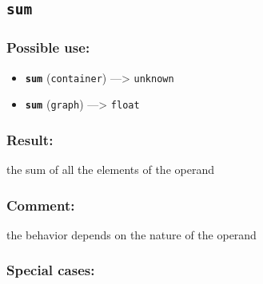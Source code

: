 \documentclass[]{book}
\providecommand{\tightlist}{%
  \setlength{\itemsep}{0pt}\setlength{\parskip}{0pt}}
\theoremstyle{definition}
\theoremstyle{definition}
\theoremstyle{definition}
\theoremstyle{remark}
\begin{document}
\subsection{\texorpdfstring{\texttt{sum}}{sum}}\label{sum}

\subsubsection{Possible use:}\label{possible-use-509}

\begin{itemize}
\tightlist
\item
  \textbf{\texttt{sum}} (\texttt{container}) ---\textgreater{}
  \texttt{unknown}
\item
  \textbf{\texttt{sum}} (\texttt{graph}) ---\textgreater{}
  \texttt{float}
\end{itemize}

\subsubsection{Result:}\label{result-492}

the sum of all the elements of the operand

\subsubsection{Comment:}\label{comment-96}

the behavior depends on the nature of the operand

\subsubsection{Special cases:}\label{special-cases-132}
\end{document}
